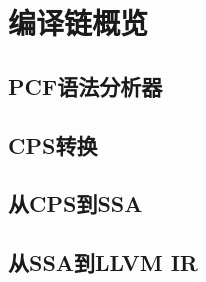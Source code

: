 
\chapter{编译链概览} \label{ch:overview}

\section{PCF语法分析器}

\section{CPS转换}

\section{从CPS到SSA}

\section{从SSA到LLVM IR}

